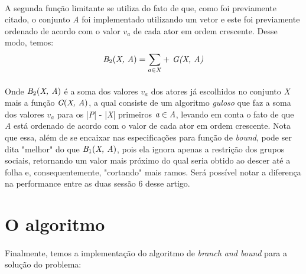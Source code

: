 \documentclass{article}
\begin{document}
\paragraph{} A segunda função limitante se utiliza do fato de que, como foi previamente citado, o conjunto \emph{A} foi implementado utilizando um vetor e este foi previamente ordenado de acordo com o valor \emph{$v_a$} de cada ator em ordem crescente. Desse modo, temos:
\begin{equation*}
    \emph{B}_2(\emph{X, A}) = \emph{$\sum_{a \in X} +$ G(X, A)}
\end{equation*}

\begin{algorithm}
    \DontPrintSemicolon
\end{algorithm}

\paragraph{} Onde $\emph{B}_2(\emph{X, A})$ é a soma dos valores \emph{$v_a$} dos atores já escolhidos no conjunto \emph{X} mais a função $\emph{G}(\emph{X, A})$, a qual consiste de um algoritmo \emph{guloso} que faz a soma dos valores \emph{$v_a$} para os |\emph{P}| - |\emph{X}| primeiros $\emph{a} \in \emph{A}$, levando em conta o fato de que \emph{A} está ordenado de acordo com o valor de cada ator em ordem crescente. Nota que essa, além de se encaixar nas especificações para função de \emph{bound}, pode ser dita "melhor" do que $\emph{B}_1(\emph{X, A})$, pois ela ignora apenas a restrição dos grupos sociais, retornando um valor mais próximo do qual seria obtido ao descer até a folha e, consequentemente, "cortando" mais ramos. Será possível notar a diferença na performance entre as duas sessão 6 desse artigo.
\pagebreak

\section{O algoritmo}

\paragraph{} Finalmente, temos a implementação do algoritmo de \emph{branch and bound} para a solução do problema:

\begin{algorithm}
    \DontPrintSemicolon
\end{algorithm}
\end{document}
